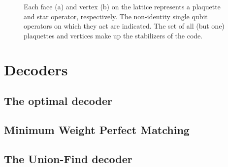 \begin{figure}[h]
  \centering
  \hspace{1cm}

  \caption{Each face (a) and vertex (b) on the lattice represents a plaquette and star operator, respectively. The non-identity single qubit operators on which they act are indicated. The set of all (but one) plaquettes and vertices make up the stabilizers of the code. }\label{sf:fig_planar}
\end{figure}

\section{Decoders}\label{sec:surface_decoders}
\subsection{The optimal decoder}\label{sec:optimal_decoder}
\subsection{Minimum Weight Perfect Matching}\label{sec:MWPMdecoder}
\subsection{The Union-Find decoder}\label{sec:UFdecoder}

